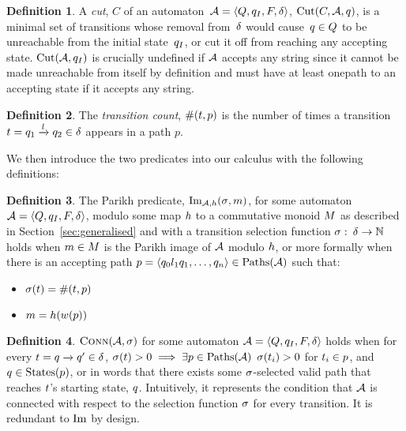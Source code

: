 \documentclass[acmsmall,review,anonymous,screen]{acmart}\settopmatter{printfolios=true,printccs=false,printacmref=true}
\theoremstyle{definition}
\newtheorem{definition}{Definition}[section]
\begin{document}
\begin{definition}
  A \textit{cut}, $C$ of an automaton~$\mathcal{A} = \left\langle Q, q_I, F, \delta\right\rangle$,
  $\operatorname{Cut}(C, \mathcal{A}, q)$, is a minimal set of transitions whose
  removal from~$\delta$ would cause~$q \in Q$ to be unreachable
  from the initial state~$q_I$, or cut it off from reaching any
  accepting state. $\operatorname{Cut}(\mathcal{A}, q_I)$ is crucially
  undefined if $\mathcal{A}$ accepts any string since it cannot be made unreachable
  from itself by definition and must have at least onepath to an accepting state
  if it accepts any string.
\end{definition}

\begin{definition}
 The \textit{transition count}, $\operatorname{\#}(t, p)$ is the
 number of times a transition $t =
 q_1 \xrightarrow{l} q_2 \in \delta$ appears in a path
 $p$.
\end{definition}

We then introduce the two predicates into our calculus with the following
definitions:

\begin{definition}\label{def:single-image}
  The Parikh predicate, $\operatorname{Im}_{\mathcal{A}, h}(\operatorname{\sigma}, m)$, for some automaton
  $\mathcal{A} = \left\langle Q, q_I, F, \delta\right\rangle$, modulo some map $h$ to a commutative monoid
  $M$ as described in Section~\ref{sec:generalised} and with a transition
  selection function $\operatorname{\sigma}:\: \delta \to \mathbb{N}$ holds when
  $m \in M$ is the Parikh image of $\mathcal{A}$ modulo
  $h$, or more formally when there is an accepting path $p =
  \left\langle q_0 l_1 q_1 , \ldots , q_n\right\rangle \in \operatorname{Paths}(\mathcal{A})$ such that:
  \begin{itemize}
    \item $\operatorname{\sigma}(t) = \operatorname{\#}(t, p)$
    \item $m = h(w(p))$
  \end{itemize}
\end{definition}

\begin{definition}
  $\operatorname{\textsc{Conn}}(\mathcal{A}, \operatorname{\sigma})$ for some automaton $\mathcal{A} =
  \left\langle Q, q_I, F, \delta\right\rangle$ holds when for every $t =
  q \xrightarrow{} q' \in \delta$, $\operatorname{\sigma}(t) > 0
  \implies \exists p \in \operatorname{Paths}(\mathcal{A})$ $\operatorname{\sigma}(t_i) > 0$
  for $t_i \in p$, and $q \in \operatorname{States}(p)$, or in words that
  there exists some $\operatorname{\sigma}$-selected valid path that reaches $t$'s
  starting state, $q$. Intuitively, it represents the condition that
  $\mathcal{A}$ is connected with respect to the selection function $\operatorname{\sigma}$ for
  every transition. It is redundant to $\operatorname{Im}$ by design.
\end{definition}
\end{document}
